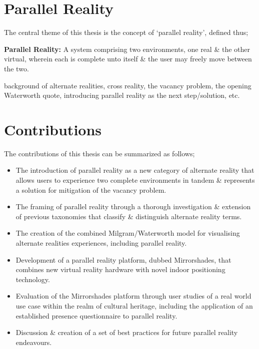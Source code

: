 
\section{Parallel Reality}

The central theme of this thesis is the concept of `parallel reality', defined thus;

\vspace{7mm}

\textbf{Parallel Reality:} A system comprising two environments, one real \& the other virtual, wherein each is complete unto itself \& the user may freely move between the two.

\vspace{7mm}




background of alternate realities, cross reality, the vacancy problem, the opening Waterworth quote, introducing parallel reality as the next step/solution, etc.


\section{Contributions}

The contributions of this thesis can be summarized as follows;

\begin{itemize}
	\item The introduction of parallel reality as a new category of alternate reality that allows users to experience two complete environments in tandem \& represents a solution for mitigation of the vacancy problem.
	\item The framing of parallel reality through a thorough investigation \& extension of previous taxonomies that classify \& distinguish alternate reality terms.
	\item The creation of the combined Milgram/Waterworth model for visualising alternate realities experiences, including parallel reality.
	\item Development of a parallel reality platform, dubbed Mirrorshades, that combines new virtual reality hardware with novel indoor positioning technology.
	\item Evaluation of the Mirrorshades platform through user studies of a real world use case within the realm of cultural heritage, including the application of an established presence questionnaire to parallel reality.
	\item Discussion \& creation of a set of best practices for future parallel reality endeavours.
\end{itemize}


